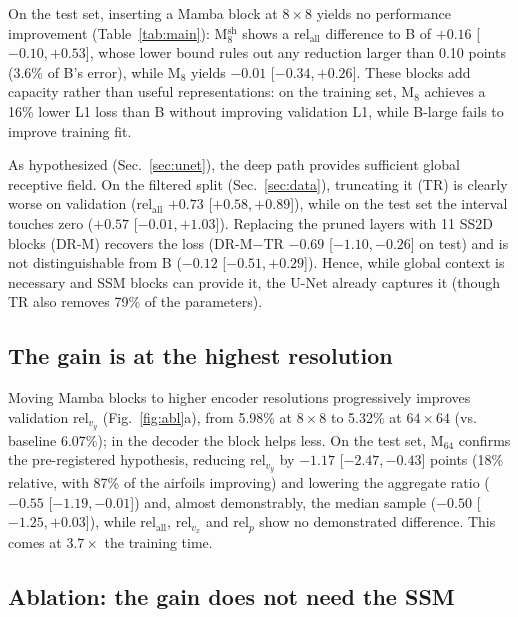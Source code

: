 \documentclass[conference]{IEEEtran}
\newcommand{\B}{B}                                  %
\newcommand{\Blarge}{B-large}                       %
\newcommand{\Msh}[1]{M$^{\mathrm{sh}}_{#1}$}        %
\newcommand{\M}[1]{M$_{#1}$}                        %
\newcommand{\DR}{DR-M}                              %
\newcommand{\TR}{TR}                                %
\newcommand{\relvy}{$\mathrm{rel}_{v_y}$}
\newcommand{\relall}{$\mathrm{rel}_{\mathrm{all}}$}
\newcommand{\relp}{$\mathrm{rel}_{p}$}
\newcommand{\ci}[2]{[$#1$,\,$#2$]}                  %
\begin{document}
On the test set, inserting a Mamba block at $8\times8$ yields no performance
improvement (Table~\ref{tab:main}): \Msh{8} shows a \relall{} difference to
\B{} of $+0.16$ \ci{-0.10}{+0.53}, whose lower bound rules out any reduction
larger than 0.10 points (3.6\% of \B's error), while \M{8} yields $-0.01$
\ci{-0.34}{+0.26}. These blocks add capacity rather than useful
representations: on the training set, \M{8} achieves a 16\% lower L1 loss than
\B{} without improving validation L1, while \Blarge{} fails to improve
training fit.

As hypothesized (Sec.~\ref{sec:unet}), the deep path provides sufficient
global receptive field. On the filtered split (Sec.~\ref{sec:data}),
truncating it (\TR) is clearly worse on validation (\relall{} $+0.73$
\ci{+0.58}{+0.89}), while on the test set the interval touches zero ($+0.57$
\ci{-0.01}{+1.03}). Replacing the pruned layers with 11 SS2D blocks (\DR)
recovers the loss (\DR$-$\TR{} $-0.69$ \ci{-1.10}{-0.26} on test) and is not
distinguishable from \B{} ($-0.12$ \ci{-0.51}{+0.29}). Hence, while global context is necessary and SSM blocks can provide it, the U-Net already captures it
(though \TR{} also removes 79\% of the parameters).

\subsection{The gain is at the highest resolution}
\label{sec:hr}

Moving Mamba blocks to higher encoder resolutions progressively improves
validation \relvy{} (Fig.~\ref{fig:abl}a), from 5.98\% at $8\times8$ to 5.32\% at $64\times64$
(vs. baseline 6.07\%); in the decoder the block helps less. On the test set, \M{64}
confirms the pre-registered hypothesis, reducing \relvy{} by $-1.17$
\ci{-2.47}{-0.43} points (18\% relative, with 87\% of the airfoils improving)
and lowering the aggregate ratio ($-0.55$ \ci{-1.19}{-0.01}) and, almost
demonstrably, the median sample ($-0.50$ \ci{-1.25}{+0.03}), while \relall,
$\mathrm{rel}_{v_x}$ and \relp{} show no demonstrated difference. This comes at
$3.7\times$ the training time.

\subsection{Ablation: the gain does not need the SSM}
\label{sec:abl}
\end{document}
